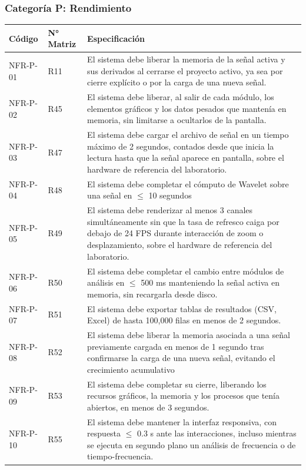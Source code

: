 \documentclass[12pt, letterpaper]{article}
\begin{document}
\subsubsection{Categoría P: Rendimiento}

\begin{longtable}{|p{2.5cm}|p{2.5cm}|p{10.1cm}|}
\hline
\rowcolor{gray!25}
\textbf{Código} & \textbf{N° Matriz} & \textbf{Especificación} \\
\hline
\endhead

\hline
\endlastfoot

NFR-P-01 & R11 & El sistema debe liberar la memoria de la señal activa y sus derivados al cerrarse el proyecto activo, ya sea por cierre explícito o por la carga de una nueva señal. \\
\hline
NFR-P-02 & R45 & El sistema debe liberar, al salir de cada módulo, los elementos gráficos y los datos pesados que mantenía en memoria, sin limitarse a ocultarlos de la pantalla. \\
\hline
NFR-P-03 & R47 & El sistema debe cargar el archivo de señal en un tiempo máximo de 2 segundos, contados desde que inicia la lectura hasta que la señal aparece en pantalla, sobre el hardware de referencia del laboratorio. \\
\hline
NFR-P-04 & R48 & El sistema debe completar el cómputo de Wavelet sobre una señal en $\leq$ 10 segundos \\
\hline
NFR-P-05 & R49 & El sistema debe renderizar al menos 3 canales simultáneamente sin que la tasa de refresco caiga por debajo de 24 FPS durante interacción de zoom o desplazamiento, sobre el hardware de referencia del laboratorio. \\
\hline
NFR-P-06 & R50 & El sistema debe completar el cambio entre módulos de análisis en $\leq$ 500 ms manteniendo la señal activa en memoria, sin recargarla desde disco. \\
\hline
NFR-P-07 & R51 & El sistema debe exportar tablas de resultados (CSV, Excel) de hasta 100,000 filas en menos de 2 segundos. \\
\hline
NFR-P-08 & R52 & El sistema debe liberar la memoria asociada a una señal previamente cargada en menos de 1 segundo tras confirmarse la carga de una nueva señal, evitando el crecimiento acumulativo \\
\hline
NFR-P-09 & R53 & El sistema debe completar su cierre, liberando los recursos gráficos, la memoria y los procesos que tenía abiertos, en menos de 3 segundos. \\
\hline
NFR-P-10 & R55 & El sistema debe mantener la interfaz responsiva, con respuesta $\leq$ 0.3 s ante las interacciones, incluso mientras se ejecuta en segundo plano un análisis de frecuencia o de tiempo-frecuencia. \\

\end{longtable}
\end{document}

